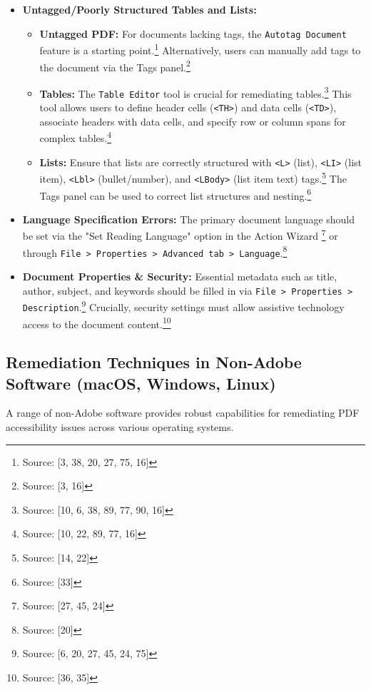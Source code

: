 \begin{itemize}[noitemsep,topsep=0pt]
    \item \textbf{Untagged/Poorly Structured Tables and Lists:}
    \begin{itemize}[noitemsep,topsep=0pt]
        \item \textbf{Untagged PDF:} For documents lacking tags, the \texttt{Autotag Document} feature is a starting point.\footnote{Source: [3, 38, 20, 27, 75, 16]} Alternatively, users can manually add tags to the document via the Tags panel.\footnote{Source: [3, 16]}
        \item \textbf{Tables:} The \texttt{Table Editor} tool is crucial for remediating tables.\footnote{Source: [10, 6, 38, 89, 77, 90, 16]} This tool allows users to define header cells (\texttt{<TH>}) and data cells (\texttt{<TD>}), associate headers with data cells, and specify row or column spans for complex tables.\footnote{Source: [10, 22, 89, 77, 16]}
        \item \textbf{Lists:} Ensure that lists are correctly structured with \texttt{<L>} (list), \texttt{<LI>} (list item), \texttt{<Lbl>} (bullet/number), and \texttt{<LBody>} (list item text) tags.\footnote{Source: [14, 22]} The Tags panel can be used to correct list structures and nesting.\footnote{Source: [33]}
    \end{itemize}
    \item \textbf{Language Specification Errors:} The primary document language should be set via the "Set Reading Language" option in the Action Wizard \footnote{Source: [27, 45, 24]} or through \texttt{File > Properties > Advanced tab > Language}.\footnote{Source: [20]}
    \item \textbf{Document Properties \& Security:} Essential metadata such as title, author, subject, and keywords should be filled in via \texttt{File > Properties > Description}.\footnote{Source: [6, 20, 27, 45, 24, 75]} Crucially, security settings must allow assistive technology access to the document content.\footnote{Source: [36, 35]}
\end{itemize}

\subsection{Remediation Techniques in Non-Adobe Software (macOS, Windows, Linux)}

A range of non-Adobe software provides robust capabilities for remediating PDF accessibility issues across various operating systems.

